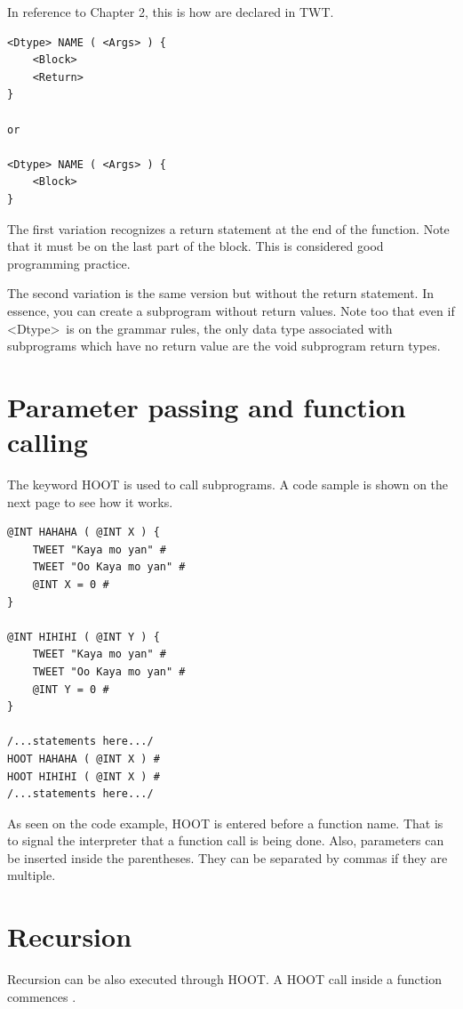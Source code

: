 \documentclass[11pt,a4paper]{report}
\begin{document}
In reference to Chapter 2, this is how  are declared in TWT.

\begin{lstlisting}
<Dtype> NAME ( <Args> ) {
	<Block>
	<Return>
}

or

<Dtype> NAME ( <Args> ) {
	<Block>
}
\end{lstlisting}

The first variation recognizes a return statement at the end of the function.
Note that it must be on the last part of the block. This is considered good
programming practice.\par

The second variation is the same version but without the return statement. In
essence, you can create a subprogram without return values. Note too that even
if \textless Dtype\textgreater\ is on the grammar rules, the only data type
associated with subprograms which have no return value are the void subprogram return types.

\section{Parameter passing and function calling}

The keyword HOOT is used to call subprograms. A code sample is shown on the next
page to see how it works.

\begin{lstlisting}
@INT HAHAHA ( @INT X ) {
    TWEET "Kaya mo yan" #
    TWEET "Oo Kaya mo yan" #
    @INT X = 0 #
}

@INT HIHIHI ( @INT Y ) {
    TWEET "Kaya mo yan" #
    TWEET "Oo Kaya mo yan" #
    @INT Y = 0 #
}

/...statements here.../
HOOT HAHAHA ( @INT X ) #
HOOT HIHIHI ( @INT X ) #
/...statements here.../
\end{lstlisting}

As seen on the code example, HOOT is entered before a function name. That is to
signal the interpreter that a function call is being done. Also, parameters can
be inserted inside the parentheses. They can be separated by commas if they are
multiple.

\section{Recursion}

Recursion can be also executed through HOOT. A HOOT call inside a function
commences .

\printindex
\end{document}
